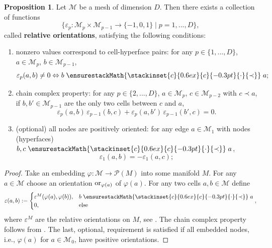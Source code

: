 \documentclass{elsarticle}
\theoremstyle{definition}
\newtheorem{proposition}[theorem]{Proposition}
\newcommand{\OR}{\mathop{\rm or}\nolimits}
\newcommand{\set}[2]{\{#1 \mid #2\}}
\newcommand{\precdot}{%
  \mathrel{%
    \ensurestackMath{%
      \stackinset{c}{0.6ex}{c}{-0.3pt}{\cdot}{\prec}%
    }%
  }%
}
\newcommand{\newterm}[1]{\textbf{#1}}
\begin{document}
\begin{proposition}
  Let $\mathcal{M}$ be a mesh of dimension $D$.
  Then there exists a collection of functions
  \begin{equation}
    \set{\varepsilon_p \colon \mathcal{M}_p \times \mathcal{M}_{p - 1} \to \{-1, 0, 1\}}{p = 1, ..., D},
  \end{equation}
  called \newterm{relative orientations}, satisfying the following conditions:
  \begin{enumerate}
    \item
      nonzero values correspond to cell-hyperface pairs:
      for any $p \in \{1, ..., D\}$,
      $a \in \mathcal{M}_p$,
      $b \in \mathcal{M}_{p - 1}$,
      \begin{equation}
        \varepsilon_p(a, b) \neq 0 \Leftrightarrow b \precdot a;
      \end{equation}
    \item
      chain complex property:
      for any $p \in \{2, ..., D\}$,
      $a \in \mathcal{M}_p$,
      $c \in \mathcal{M}_{p - 2}$ with $c \prec a$,
      if $b, b' \in \mathcal{M}_{p - 1}$ are the only two cells between $c$ and $a$,
      \begin{equation}
        \varepsilon_p(a, b)\, \varepsilon_{p - 1}(b, c) + \varepsilon_p(a, b')\, \varepsilon_{p - 1}(b', c) = 0.
      \end{equation}
    \item
      (optional) all nodes are positively oriented:
      for any edge $a \in \mathcal{M}_1$ with nodes (hyperfaces) $b, c \precdot a$,
      \begin{equation}
        \varepsilon_1(a, b) = - \varepsilon_1(a, c);
      \end{equation}
  \end{enumerate}
\end{proposition}
\begin{proof}
  Take an embedding $\varphi \colon \mathcal{M} \to \mathcal{P}(M)$ into some manifold $M$.
  For any $a \in \mathcal{M}$ choose an orientation $\OR_{\varphi(a)}$ of $\varphi(a)$.
  For any two cells $a, b \in \mathcal{M}$ define
  \begin{equation}
    \varepsilon(a, b) :=
    \begin{cases}
      \varepsilon^M(\varphi(a), \varphi(b)), & b \precdot a \\
      0, & \text{else}
    \end{cases},
  \end{equation}
  where $\varepsilon^M$ are the relative orientations on $M$, see .
  The chain complex property follows from .
  The last, optional, requirement is satisfied if all embedded nodes, i.e., $\varphi(a)$ for $a \in \mathcal{M}_0$, have positive orientations.
\end{proof}
\end{document}
